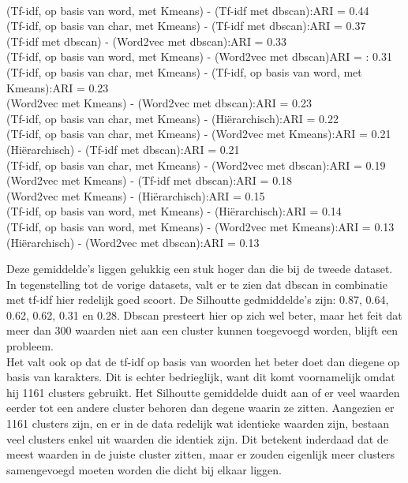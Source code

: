 \\\indent(Tf-idf, op basis van word, met Kmeans) - (Tf-idf met dbscan):\hfill ARI =  0.44
\\\indent(Tf-idf, op basis van char, met Kmeans) - (Tf-idf met dbscan):\hfill ARI =  0.37
\\\indent(Tf-idf met dbscan) - (Word2vec met dbscan):\hfill ARI =  0.33
\\\indent(Tf-idf, op basis van word, met Kmeans) - (Word2vec met dbscan)\hfill ARI = : 0.31
\\\indent(Tf-idf, op basis van char, met Kmeans) - (Tf-idf, op basis van word, met Kmeans):\hfill ARI =  0.23
\\\indent(Word2vec met Kmeans) - (Word2vec met dbscan):\hfill ARI =  0.23
\\\indent(Tf-idf, op basis van char, met Kmeans) - (Hiërarchisch):\hfill ARI =  0.22
\\\indent(Tf-idf, op basis van char, met Kmeans) - (Word2vec met Kmeans):\hfill ARI =  0.21
\\\indent(Hiërarchisch) - (Tf-idf met dbscan):\hfill ARI =  0.21
\\\indent(Tf-idf, op basis van char, met Kmeans) - (Word2vec met dbscan):\hfill ARI =  0.19
\\\indent(Word2vec met Kmeans) - (Tf-idf met dbscan):\hfill ARI =  0.18
\\\indent(Word2vec met Kmeans) - (Hiërarchisch):\hfill ARI =  0.15
\\\indent(Tf-idf, op basis van word, met Kmeans) - (Hiërarchisch):\hfill ARI =  0.14
\\\indent(Tf-idf, op basis van word, met Kmeans) - (Word2vec met Kmeans):\hfill ARI =  0.13
\\\indent(Hiërarchisch) - (Word2vec met dbscan):\hfill ARI =  0.13
\\\indent

Deze gemiddelde's liggen gelukkig een stuk hoger dan die bij de tweede dataset. In tegenstelling tot de vorige datasets, valt er te zien dat dbscan in combinatie met tf-idf hier redelijk goed scoort. De Silhoutte gedmiddelde's zijn: 0.87, 0.64, 0.62, 0.62, 0.31 en 0.28. Dbscan presteert hier op zich wel beter, maar het feit dat meer dan 300 waarden niet aan een cluster kunnen toegevoegd worden, blijft een probleem.
\\\indent
Het valt ook op dat de tf-idf op basis van woorden het beter doet dan diegene op basis van karakters. Dit is echter bedrieglijk, want dit komt voornamelijk omdat hij 1161 clusters gebruikt. Het Silhoutte gemiddelde duidt aan of er veel waarden eerder tot een andere cluster behoren dan degene waarin ze zitten. Aangezien er 1161 clusters zijn, en er in de data redelijk wat identieke waarden zijn, bestaan veel clusters enkel uit waarden die identiek zijn. Dit betekent inderdaad dat de meest waarden in de juiste cluster zitten, maar er zouden eigenlijk meer clusters samengevoegd moeten worden die dicht bij elkaar liggen.


